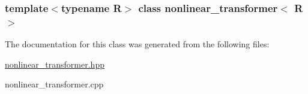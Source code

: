 \subsubsection*{template$<$typename R$>$ class nonlinear\_\-transformer$<$ R $>$}



The documentation for this class was generated from the following files:\begin{DoxyCompactItemize}
\item 
\hyperlink{nonlinear__transformer_8hpp}{nonlinear\_\-transformer.hpp}\item 
nonlinear\_\-transformer.cpp\end{DoxyCompactItemize}
